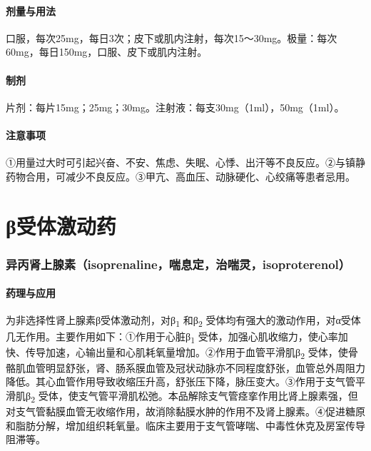 \paragraph{剂量与用法}

口服，每次25mg，每日3次；皮下或肌内注射，每次15～30mg。极量：每次60mg，每日150mg，口服、皮下或肌内注射。

\paragraph{制剂}

片剂：每片15mg；25mg；30mg。注射液：每支30mg（1ml），50mg（1ml）。

\paragraph{注意事项}

①用量过大时可引起兴奋、不安、焦虑、失眠、心悸、出汗等不良反应。②与镇静药物合用，可减少不良反应。③甲亢、高血压、动脉硬化、心绞痛等患者忌用。

\protect\hypertarget{text00407.html}{}{}

\section{β受体激动药}

\subsubsection{异丙肾上腺素（isoprenaline，喘息定，治喘灵，isoproterenol）}

\paragraph{药理与应用}

为非选择性肾上腺素β受体激动剂，对β\textsubscript{1} 和β\textsubscript{2}
受体均有强大的激动作用，对α受体几无作用。主要作用如下：①作用于心脏β\textsubscript{1}
受体，加强心肌收缩力，使心率加快、传导加速，心输出量和心肌耗氧量增加。②作用于血管平滑肌β\textsubscript{2}
受体，使骨骼肌血管明显舒张，肾、肠系膜血管及冠状动脉亦不同程度舒张，血管总外周阻力降低。其心血管作用导致收缩压升高，舒张压下降，脉压变大。③作用于支气管平滑肌β\textsubscript{2}
受体，使支气管平滑肌松弛。本品解除支气管痉挛作用比肾上腺素强，但对支气管黏膜血管无收缩作用，故消除黏膜水肿的作用不及肾上腺素。④促进糖原和脂肪分解，增加组织耗氧量。临床主要用于支气管哮喘、中毒性休克及房室传导阻滞等。

